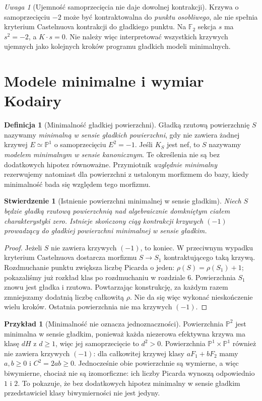 \documentclass[11pt,a4paper,openany]{report}
\numberwithin{equation}{section}
\theoremstyle{plain}
\newtheorem{stwierdzenie}[twierdzenie]{Stwierdzenie}
\theoremstyle{definition}
\newtheorem{definicja}[twierdzenie]{Definicja}
\newtheorem{przyklad}[twierdzenie]{Przykład}
\theoremstyle{remark}
\newtheorem{uwaga}[twierdzenie]{Uwaga}
\newcommand{\PP}{\mathbb P}
\begin{document}
\begin{uwaga}[Ujemność samoprzecięcia nie daje dowolnej kontrakcji]
Krzywa o samoprzecięciu $-2$ może być kontraktowalna
do \emph{punktu osobliwego}, ale nie spełnia kryterium
Castelnuova kontrakcji do gładkiego punktu.
Na $\mathbb F_2$ sekcja $s$ ma $s^2=-2$,
a $K\cdot s=0$. Nie należy więc interpretować
wszystkich krzywych ujemnych jako kolejnych kroków
programu gładkich modeli minimalnych.
\end{uwaga}

\section{Modele minimalne i wymiar Kodairy}
\label{sec:ga8-kodaira-minimal}

\begin{definicja}[Minimalność gładkiej powierzchni]
\label{def:ga8-minimal}
Gładką rzutową powierzchnię $S$ nazywamy
\emph{minimalną w sensie gładkich powierzchni},
gdy nie zawiera żadnej krzywej $E\simeq\PP^1$
o samoprzecięciu $E^2=-1$. Jeśli $K_S$ jest nef,
to $S$ nazywamy \emph{modelem minimalnym w sensie
kanonicznym}. Te określenia nie są bez dodatkowych
hipotez równoważne. Przymiotnik \emph{względnie minimalny}
rezerwujemy natomiast dla powierzchni z ustalonym morfizmem
do bazy, kiedy minimalność bada się względem tego morfizmu.
\end{definicja}

\begin{stwierdzenie}[Istnienie powierzchni minimalnej w sensie gładkim]
\label{st:ga8-terminate-minusone}
Niech $S$ będzie gładką rzutową powierzchnią nad
algebraicznie domkniętym ciałem charakterystyki zero.
Istnieje skończony ciąg kontrakcji krzywych $(-1)$
prowadzący do gładkiej powierzchni minimalnej w sensie gładkim.
\end{stwierdzenie}
\begin{proof}
Jeżeli $S$ nie zawiera krzywych $(-1)$, to koniec.
W przeciwnym wypadku kryterium Castelnuova dostarcza
morfizmu $S\to S_1$ kontraktującego taką krzywą.
Rozdmuchanie punktu zwiększa liczbę Picarda o jeden:
$\rho(S)=\rho(S_1)+1$; pokazaliśmy już rozkład
klas po rozdmuchaniu w rozdziale 6. Powierzchnia
$S_1$ znowu jest gładka i rzutowa. Powtarzając
konstrukcję, za każdym razem zmniejszamy dodatnią
liczbę całkowitą $\rho$. Nie da się więc wykonać
nieskończenie wielu kroków. Ostatnia powierzchnia
nie ma krzywych $(-1)$.
\end{proof}

\begin{przyklad}[Minimalność nie oznacza jednoznaczności]
Powierzchnia $\PP^2$ jest minimalna w sensie gładkim,
ponieważ każda niezerowa efektywna krzywa ma
klasę $dH$ z $d\ge1$, więc jej samoprzecięcie
to $d^2>0$. Powierzchnia
$\PP^1\times\PP^1$ również nie zawiera krzywych
$(-1)$: dla całkowitej krzywej klasy $aF_1+bF_2$
mamy $a,b\ge0$ i $C^2=2ab\ge0$.
Jednocześnie obie powierzchnie są wymierne, a więc
biwymierne, chociaż nie są izomorficzne:
ich liczby Picarda wynoszą odpowiednio $1$ i $2$.
To pokazuje, że bez dodatkowych hipotez
minimalny w sensie gładkim przedstawiciel klasy
biwymierności nie jest jedyny.
\end{przyklad}
\end{document}
